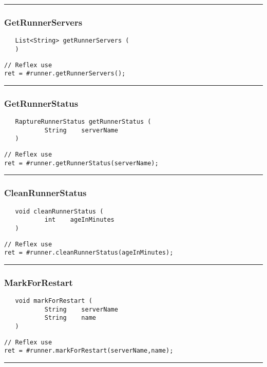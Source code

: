 \rule{15cm}{2pt}
\subsubsection{GetRunnerServers}
\label{Api:GetRunnerServers}
\begin{verbatim}
   List<String> getRunnerServers (
   )
\end{verbatim}
\begin{lstlisting}[language=reflex]
// Reflex use
ret = #runner.getRunnerServers();
\end{lstlisting}



\rule{15cm}{2pt}
\subsubsection{GetRunnerStatus}
\label{Api:GetRunnerStatus}
\begin{verbatim}
   RaptureRunnerStatus getRunnerStatus (
           String    serverName
   )
\end{verbatim}
\begin{lstlisting}[language=reflex]
// Reflex use
ret = #runner.getRunnerStatus(serverName);
\end{lstlisting}



\rule{15cm}{2pt}
\subsubsection{CleanRunnerStatus}
\label{Api:CleanRunnerStatus}
\begin{verbatim}
   void cleanRunnerStatus (
           int    ageInMinutes
   )
\end{verbatim}
\begin{lstlisting}[language=reflex]
// Reflex use
ret = #runner.cleanRunnerStatus(ageInMinutes);
\end{lstlisting}



\rule{15cm}{2pt}
\subsubsection{MarkForRestart}
\label{Api:MarkForRestart}
\begin{verbatim}
   void markForRestart (
           String    serverName
           String    name
   )
\end{verbatim}
\begin{lstlisting}[language=reflex]
// Reflex use
ret = #runner.markForRestart(serverName,name);
\end{lstlisting}



\rule{15cm}{2pt}
